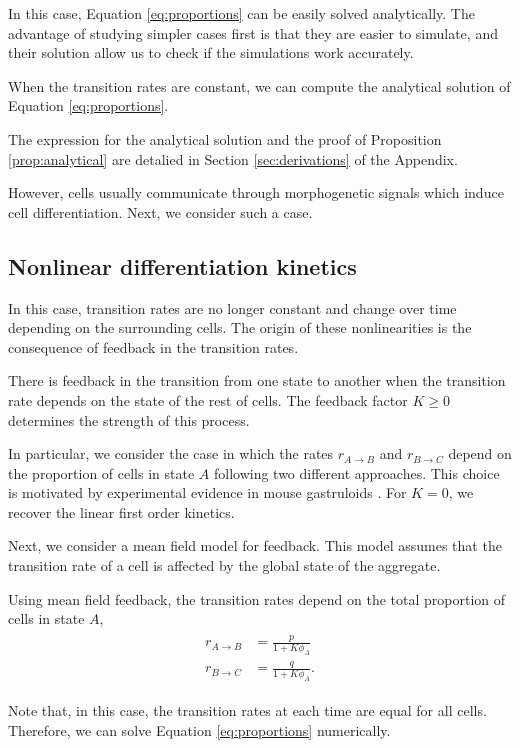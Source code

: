 In this case, Equation \ref{eq:proportions} can be easily solved analytically. The advantage of studying simpler cases first is that they are easier to simulate, and their solution allow us to check if the simulations work accurately.

\begin{proposition}\label{prop:analytical}
    When the transition rates are constant, we can compute the analytical solution of Equation \ref{eq:proportions}.
\end{proposition}

The expression for the analytical solution and the proof of Proposition \ref{prop:analytical} are detalied in Section \ref{sec:derivations} of the Appendix.

However, cells usually communicate through morphogenetic signals which induce cell differentiation. Next, we consider such a case.


\subsection{Nonlinear differentiation kinetics}

In this case, transition rates are no longer constant and change over time depending on the surrounding cells. The origin of these nonlinearities is the consequence of feedback in the transition rates.

\begin{definition}
    There is feedback in the transition from one state to another when the transition rate depends on the state of the rest of cells. The feedback factor $K\geq0$ determines the strength of this process.
\end{definition}

In particular, we consider the case in which the rates $r_{A\rightarrow B}$ and $r_{B\rightarrow C}$ depend on the proportion of cells in state $A$ following two different approaches. This choice is motivated by experimental evidence in mouse gastruloids \parencite{Oriola_2025}. For $K=0$, we recover the linear first order kinetics.

Next, we consider a mean field model for feedback. This model assumes that the transition rate of a cell is affected by the global state of the aggregate.

\begin{definition}
    Using mean field feedback, the transition rates depend on the total proportion of cells in state $A$,
    \begin{align}\label{eq:rates-mf}
        \begin{aligned}
            r_{A\rightarrow B}&=\frac{p}{1+K\phi_A}\\
            r_{B\rightarrow C}&=\frac{q}{1+K\phi_A}.
        \end{aligned}
    \end{align}
\end{definition}
Note that, in this case, the transition rates at each time are equal for all cells. Therefore, we can solve Equation \ref{eq:proportions} numerically.

